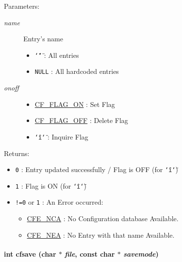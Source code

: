 \begin{Desc}
\item[Parameters:]
\begin{description}
\item[{\em name}]Entry's name\begin{itemize}
\item {\tt \char`\"{}\char`\"{}} : All entries\item {\tt NULL} : All hardcoded entries\end{itemize}
\item[{\em onoff}]\begin{itemize}
\item \hyperlink{group__cflib__core_g355c714f2912ac336b8b03468c978d8c}{CF\_\-FLAG\_\-ON} : Set Flag \item \hyperlink{group__cflib__core_g7010abac2c80c121772da4d9c03332ee}{CF\_\-FLAG\_\-OFF} : Delete Flag \item {\tt \char`\"{}i\char`\"{}} : Inquire Flag\end{itemize}
\end{description}
\end{Desc}
\begin{Desc}
\item[Returns:]\begin{itemize}
\item {\tt 0} : Entry updated successfully / Flag is OFF (for {\tt \char`\"{}i\char`\"{}}) \item {\tt 1} : Flag is ON (for {\tt \char`\"{}i\char`\"{}}) \item {\tt !=0} or {\tt 1} : An Error occurred:\begin{itemize}
\item \hyperlink{group__errors_gf8cd36471ddcc549668f49238855609d}{CFE\_\-NCA} : No Configuration database Available. \item \hyperlink{group__errors_g7f7e54a5ccefa34556fe6da3b35b4f27}{CFE\_\-NEA} : No Entry with that name Available.  \end{itemize}
\end{itemize}
\end{Desc}
\hypertarget{group__setting__saving_g046d8a68eae35b987eacca04a9a06cca}{
\paragraph[{cfsave}]{\setlength{\rightskip}{0pt plus 5cm}int cfsave (char $\ast$ {\em file}, \/  const char $\ast$ {\em savemode})}\hfill}
\label{group__setting__saving_g046d8a68eae35b987eacca04a9a06cca}


